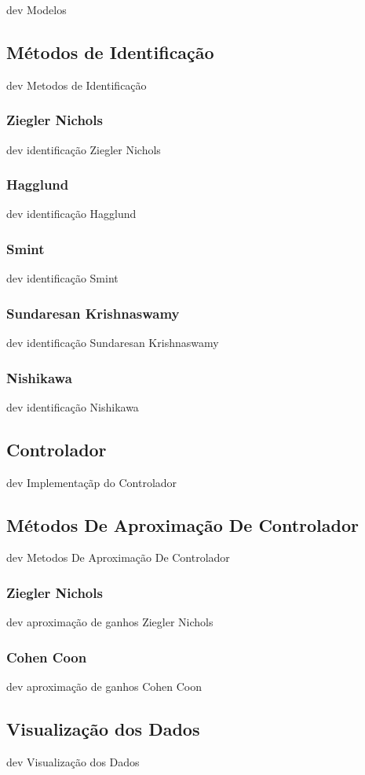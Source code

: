 dev Modelos

\subsection{Métodos de Identificação}

dev Metodos de Identificação

\subsubsection{Ziegler Nichols}

dev identificação Ziegler Nichols

\subsubsection{Hagglund}

dev identificação Hagglund

\subsubsection{Smint}

dev identificação Smint

\subsubsection{Sundaresan Krishnaswamy}

dev identificação Sundaresan Krishnaswamy

\subsubsection{Nishikawa}

dev identificação Nishikawa

\subsection{Controlador}

dev Implementaçãp do Controlador

\subsection{Métodos De Aproximação De Controlador}

dev Metodos De Aproximação De Controlador

\subsubsection{Ziegler Nichols}

dev aproximação de ganhos Ziegler Nichols

\subsubsection{Cohen Coon}

dev aproximação de ganhos Cohen Coon

\subsection{Visualização dos Dados}

dev Visualização dos Dados
